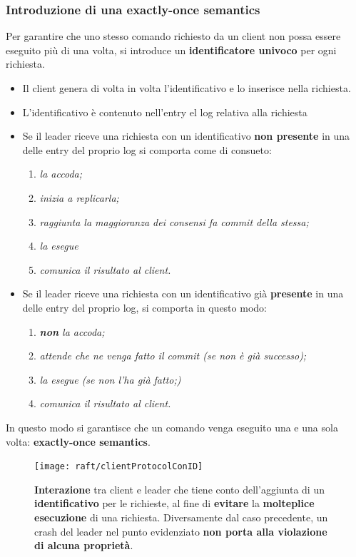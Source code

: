  	\subsubsection{Introduzione di una exactly-once semantics}
 	Per garantire che uno stesso comando richiesto da un client non possa essere eseguito più di una volta, si introduce un \textbf{identificatore univoco} per ogni richiesta.  

 	\begin{itemize}
 		\item{{Il client genera di volta in volta l'identificativo e lo inserisce nella richiesta.}}
 		\item{{L'identificativo è contenuto nell'entry el log relativa alla richiesta}}
 		\item{{Se il leader riceve una richiesta con un identificativo \textbf{non presente} in una delle entry del proprio log si comporta come di consueto: 
 			\begin{enumerate}
 				\item{\emph{la accoda;}}
 				\item{\emph{inizia a replicarla;}}
 				\item{\emph{raggiunta la maggioranza dei consensi fa commit della stessa;}}
 				\item{\emph{la esegue}}
 				\item{\emph{comunica il risultato al client.}}
 			\end{enumerate}
 		}}
 		\item{Se il leader riceve una richiesta con un identificativo già \textbf{presente} in una delle entry del proprio log, si comporta in questo modo:
			\begin{enumerate}
 				\item{\emph{\textbf{non} la accoda;}}
 				\item{\emph{attende che ne venga fatto il commit (se non è già successo);}}
 				\item{\emph{la esegue (se non l'ha già fatto;)}}
 				\item{\emph{comunica il risultato al client.}}
 				
 			\end{enumerate}
 		}
 		
 	\end{itemize}

In questo modo si garantisce che un comando venga eseguito una e una sola volta: \textbf{exactly-once semantics}.

	  \begin{figure}[H]
	    \centering
	    \texttt{[image: raft/clientProtocolConID]}
	    \caption{\textbf{Interazione} tra client e leader che tiene conto dell'aggiunta di un \textbf{identificativo} per le richieste, al fine di \textbf{evitare} la \textbf{molteplice esecuzione} di una richiesta. Diversamente dal caso precedente, un crash del leader nel punto evidenziato \textbf{non porta alla violazione di alcuna proprietà}.}
	    \label{fig:figure 13}
	  \end{figure} 

